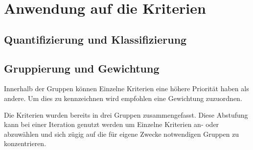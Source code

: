 \section{Anwendung auf die Kriterien}

\subsection{Quantifizierung und Klassifizierung}

\subsection{Gruppierung und Gewichtung}

Innerhalb der Gruppen können Einzelne Kriterien eine höhere Priorität haben als andere.
Um dies zu kennzeichnen wird empfohlen eine Gewichtung zuzuordnen.

Die Kriterien wurden bereits in drei Gruppen zusammengefasst.
Diese Abstufung kann bei einer Iteration genutzt werden um 
Einzelne Kriterien an- oder abzuwählen und
sich zügig auf die für eigene Zwecke notwendigen Gruppen zu konzentrieren.

